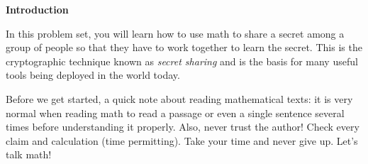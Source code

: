 \begin{center} \textbf{Introduction} \end{center}

\indent In this problem set, you will learn how to use math to share a secret among a group of people so that they have to work together to learn the secret. This is the cryptographic technique known as \emph{secret sharing} and is the basis for many useful tools being deployed in the world today.

Before we get started, a quick note about reading mathematical texts: it is very normal when reading math to read a passage or even a single sentence several times before understanding it properly. Also, never trust the author! Check every claim and calculation (time permitting). Take your time and never give up. Let's talk math!